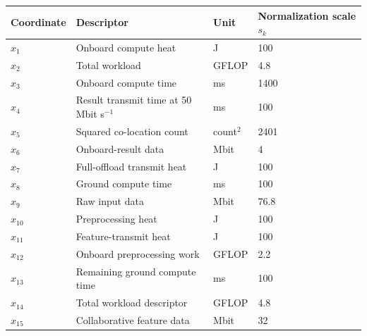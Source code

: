 \begin{tabular}{llll}
\toprule
Coordinate & Descriptor & Unit & Normalization scale $s_k$ \\
\midrule
$x_1$ & Onboard compute heat & J & 100 \\
$x_2$ & Total workload & GFLOP & 4.8 \\
$x_3$ & Onboard compute time & ms & 1400 \\
$x_4$ & Result transmit time at 50 Mbit s$^{-1}$ & ms & 100 \\
$x_5$ & Squared co-location count & count$^2$ & 2401 \\
$x_6$ & Onboard-result data & Mbit & 4 \\
$x_7$ & Full-offload transmit heat & J & 100 \\
$x_8$ & Ground compute time & ms & 100 \\
$x_9$ & Raw input data & Mbit & 76.8 \\
$x_{10}$ & Preprocessing heat & J & 100 \\
$x_{11}$ & Feature-transmit heat & J & 100 \\
$x_{12}$ & Onboard preprocessing work & GFLOP & 2.2 \\
$x_{13}$ & Remaining ground compute time & ms & 100 \\
$x_{14}$ & Total workload descriptor & GFLOP & 4.8 \\
$x_{15}$ & Collaborative feature data & Mbit & 32 \\
\bottomrule
\end{tabular}